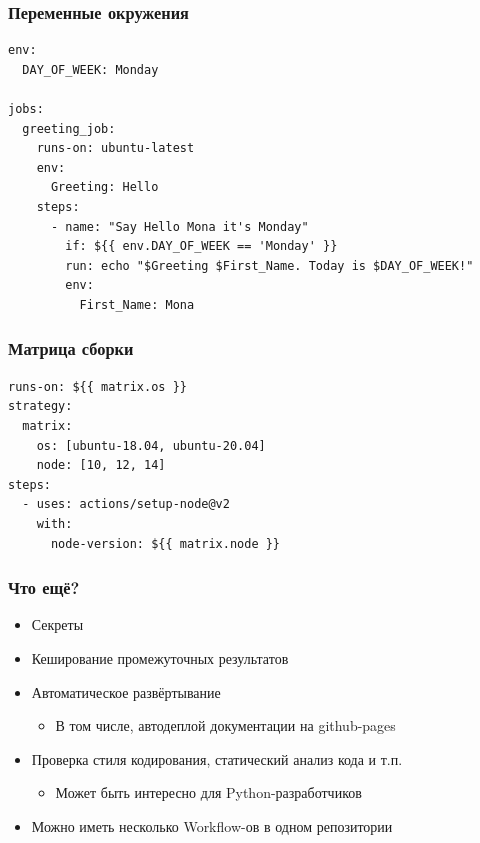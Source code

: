 \documentclass{../../slides-style}
\begin{document}
    \begin{frame}[fragile]
        \frametitle{Переменные окружения}
        \begin{scriptsize}
            \begin{verbatim}
env:
  DAY_OF_WEEK: Monday

jobs:
  greeting_job:
    runs-on: ubuntu-latest
    env:
      Greeting: Hello
    steps:
      - name: "Say Hello Mona it's Monday"
        if: ${{ env.DAY_OF_WEEK == 'Monday' }}
        run: echo "$Greeting $First_Name. Today is $DAY_OF_WEEK!"
        env:
          First_Name: Mona
            \end{verbatim}
        \end{scriptsize}
    \end{frame}

    \begin{frame}[fragile]
        \frametitle{Матрица сборки}
        \begin{scriptsize}
            \begin{verbatim}
runs-on: ${{ matrix.os }}
strategy:
  matrix:
    os: [ubuntu-18.04, ubuntu-20.04]
    node: [10, 12, 14]
steps:
  - uses: actions/setup-node@v2
    with:
      node-version: ${{ matrix.node }}
            \end{verbatim}
        \end{scriptsize}
    \end{frame}

    \begin{frame}
        \frametitle{Что ещё?}
        \begin{itemize}
            \item Секреты
            \item Кеширование промежуточных результатов
            \item Автоматическое развёртывание
            \begin{itemize}
                \item В том числе, автодеплой документации на github-pages
            \end{itemize}
            \item Проверка стиля кодирования, статический анализ кода и т.п.
            \begin{itemize}
                \item Может быть интересно для Python-разработчиков
            \end{itemize}
            \item Можно иметь несколько Workflow-ов в одном репозитории
        \end{itemize}
    \end{frame}
\end{document}
